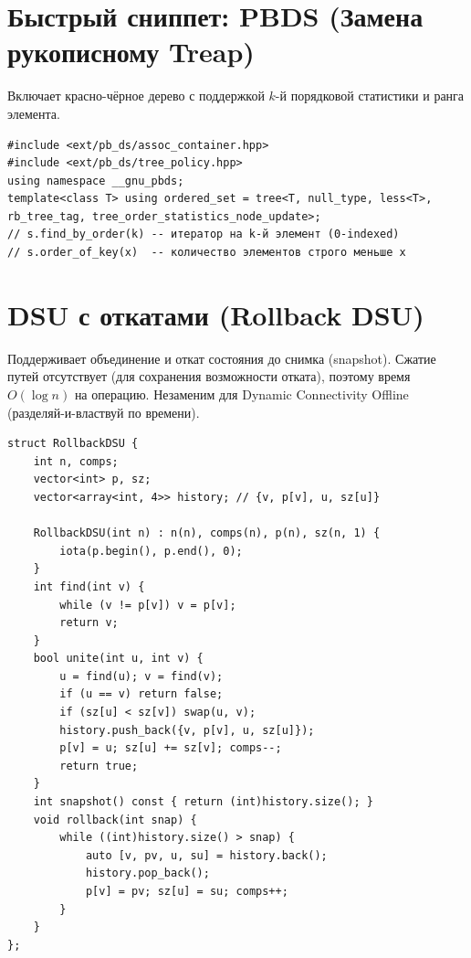 \section{Быстрый сниппет: PBDS (Замена рукописному Treap)}
Включает красно-чёрное дерево с поддержкой $k$-й порядковой статистики и ранга элемента.
\begin{lstlisting}[name=pbds_snippet]
#include <ext/pb_ds/assoc_container.hpp>
#include <ext/pb_ds/tree_policy.hpp>
using namespace __gnu_pbds;
template<class T> using ordered_set = tree<T, null_type, less<T>, rb_tree_tag, tree_order_statistics_node_update>;
// s.find_by_order(k) -- итератор на k-й элемент (0-indexed)
// s.order_of_key(x)  -- количество элементов строго меньше x
\end{lstlisting}

\section{DSU с откатами (Rollback DSU)}
Поддерживает объединение и откат состояния до снимка (snapshot).
Сжатие путей отсутствует (для сохранения возможности отката), поэтому время $O(\log n)$ на операцию. Незаменим для Dynamic Connectivity Offline (разделяй-и-властвуй по времени).
\begin{lstlisting}[name=rollback_dsu]
struct RollbackDSU {
    int n, comps;
    vector<int> p, sz;
    vector<array<int, 4>> history; // {v, p[v], u, sz[u]}

    RollbackDSU(int n) : n(n), comps(n), p(n), sz(n, 1) {
        iota(p.begin(), p.end(), 0);
    }
    int find(int v) {
        while (v != p[v]) v = p[v];
        return v;
    }
    bool unite(int u, int v) {
        u = find(u); v = find(v);
        if (u == v) return false;
        if (sz[u] < sz[v]) swap(u, v);
        history.push_back({v, p[v], u, sz[u]});
        p[v] = u; sz[u] += sz[v]; comps--;
        return true;
    }
    int snapshot() const { return (int)history.size(); }
    void rollback(int snap) {
        while ((int)history.size() > snap) {
            auto [v, pv, u, su] = history.back();
            history.pop_back();
            p[v] = pv; sz[u] = su; comps++;
        }
    }
};
\end{lstlisting}

